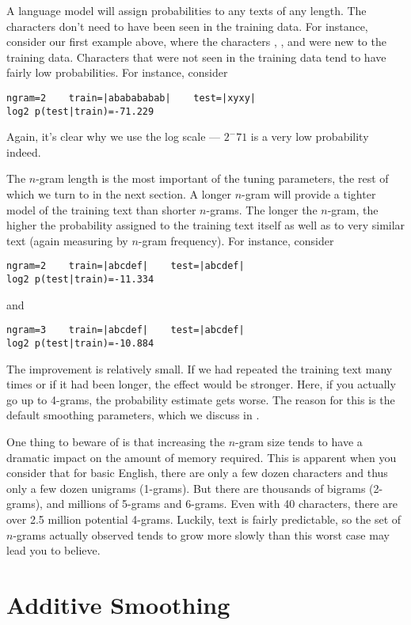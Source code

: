 A language model will assign probabilities to any texts of any length.
The characters don't need to have been seen in the training data.  For
instance, consider our first example above, where the characters
, , and  were new to the
training data.  Characters that were not seen in the training data tend
to have fairly low probabilities.  For instance, consider
%
\begin{verbatim}
ngram=2    train=|ababababab|    test=|xyxy|
log2 p(test|train)=-71.229
\end{verbatim}
%
Again, it's clear why we use the log scale --- $2^-{71}$ is a very low
probability indeed.

The $n$-gram length is the most important of the tuning parameters,
the rest of which we turn to in the next section.  A longer $n$-gram
will provide a tighter model of the training text than shorter
$n$-grams.  The longer the $n$-gram, the higher the probability
assigned to the training text itself as well as to very similar text
(again measuring by $n$-gram frequency).  For instance, consider

\begin{verbatim}
ngram=2    train=|abcdef|    test=|abcdef|
log2 p(test|train)=-11.334
\end{verbatim}

and

\begin{verbatim}
ngram=3    train=|abcdef|    test=|abcdef|
log2 p(test|train)=-10.884
\end{verbatim}

The improvement is relatively small.  If we had repeated the training
text many times or if it had been longer, the effect would be
stronger.  Here, if you actually go up to 4-grams, the probability
estimate gets worse.  The reason for this is the default smoothing
parameters, which we discuss in .

One thing to beware of is that increasing the $n$-gram size tends to
have a dramatic impact on the amount of memory required.  This is
apparent when you consider that for basic English, there are only a
few dozen characters and thus only a few dozen unigrams (1-grams).
But there are thousands of bigrams (2-grams), and millions of
5-grams and 6-grams.  Even with 40 characters, there are over
2.5 million potential 4-grams.  Luckily, text is fairly predictable,
so the set of $n$-grams actually observed tends to grow more
slowly than this worst case may lead you to believe.  


\section{Additive Smoothing}\label{section:char-lm-smoothing}












